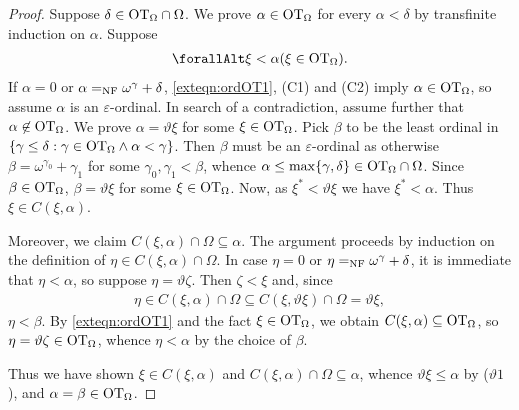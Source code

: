 \documentclass[UKenglish,cleveref,DIV=12]{scrartcl}
\let\forall\forallAlt
\theoremstyle{definition}
\theoremstyle{definition}
\begin{document}
\begin{proof}
Suppose $\delta\in\mathrm{OT}_\Omega\cap\Omega$. We prove $\alpha\in\mathrm{OT}_\Omega$ for every $\alpha<\delta$ by transfinite induction on $\alpha$. Suppose
\begin{align}\label{exteqn:ordOT1}
  \forall\xi<\alpha(\xi\in\OT_\Omega).
\end{align}
If $\alpha=0$ or $\alpha=_{\mathrm{NF}}\omega^\gamma+\delta$, \cref{exteqn:ordOT1}, (C1) and (C2) imply $\alpha\in\mathrm{OT}_\Omega$, so assume
$\alpha$ is an $\varepsilon$-ordinal. In search of a contradiction, assume further that $\alpha\not\in\mathrm{OT}_\Omega$. We prove $\alpha=\vartheta\xi$ for some $\xi\in\mathrm{OT}_\Omega$. Pick $\beta$ to be the least ordinal in $\{\gamma\le\delta:\gamma\in\mathrm{OT}_\Omega\land\alpha<\gamma\}$. Then $\beta$ must be an $\varepsilon$-ordinal as otherwise
$\beta=\omega^{\gamma_0}+\gamma_1$ for some $\gamma_0,\gamma_1<\beta$, whence
$\alpha\le\max\{\gamma,\delta\}\in\mathrm{OT}_\Omega\cap\Omega$. Since
$\beta\in\mathrm{OT}_\Omega$, $\beta=\vartheta\xi$ for some $\xi\in\mathrm{OT}_\Omega$. Now, as
$\xi^*<\vartheta\xi$ we have $\xi^*<\alpha$. Thus $\xi\in C(\xi,\alpha)$.

Moreover, we claim $C(\xi,\alpha)\cap\Omega\subseteq\alpha$. The argument proceeds by
induction on the definition of $\eta\in C(\xi,\alpha)\cap\Omega$. In case
$\eta=0$ or $\eta=_{\mathrm{NF}}\omega^\gamma+\delta$, it is immediate that $\eta<\alpha$, so suppose
$\eta=\vartheta\zeta$. Then $\zeta<\xi$ and, since
\begin{align*}
  \eta\in C(\xi,\alpha)\cap\Omega\subseteq C(\xi,\vartheta\xi)\cap\Omega=\vartheta\xi,
\end{align*}
$\eta<\beta$. By \cref{exteqn:ordOT1} and the fact $\xi\in\mathrm{OT}_\Omega$, we obtain $C(\xi,\alpha)\subseteq\mathrm{OT}_\Omega$, so
$\eta=\vartheta\zeta\in\mathrm{OT}_\Omega$, whence $\eta<\alpha$ by the choice of
$\beta$.

Thus we have shown $\xi\in C(\xi,\alpha)$ and $C(\xi,\alpha)\cap\Omega\subseteq \alpha$, whence $\vartheta\xi\le\alpha$ by ($\vartheta1$), and $\alpha=\beta\in\mathrm{OT}_\Omega$.
\end{proof}
\end{document}
